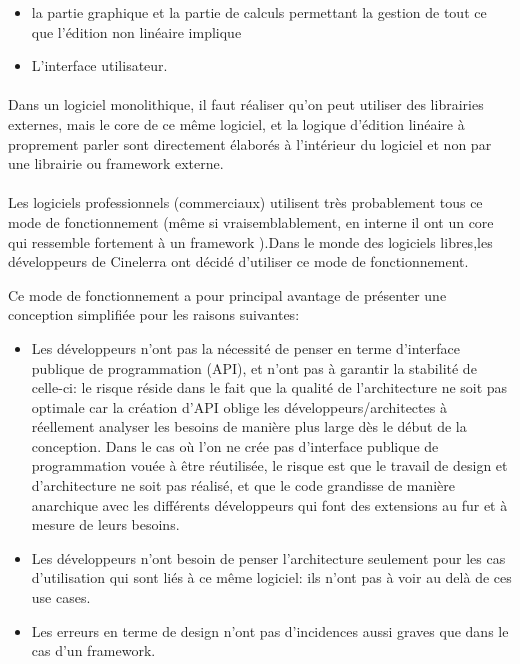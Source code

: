 \begin{itemize} \setlength{\itemsep}{2mm}

  \item {la partie graphique et la partie de calculs
    permettant la gestion de tout ce que l'édition non linéaire
    implique}

  \item {L'interface utilisateur.}

\end {itemize}

\paragraph{}

Dans un logiciel monolithique, il faut réaliser qu'on
peut utiliser des librairies externes, mais le core de ce même logiciel,
et la logique d'édition linéaire à proprement parler sont directement
élaborés à l'intérieur du logiciel et non par une librairie ou
framework  externe.

\paragraph{}

Les logiciels professionnels (commerciaux) utilisent très probablement
tous ce mode de fonctionnement (même si vraisemblablement,
en interne il ont un core qui ressemble fortement à un framework
).Dans le monde des logiciels libres,les développeurs
de Cinelerra ont décidé d'utiliser ce mode de fonctionnement.

Ce mode de fonctionnement a pour principal avantage de présenter une
conception simplifiée pour les raisons suivantes:


\begin{itemize} \setlength{\itemsep}{2mm}

  \item {Les développeurs n'ont pas la nécessité de penser
    en terme d'interface publique de programmation (API), et
    n'ont pas à garantir la stabilité de celle-ci: le risque réside
    dans le fait que la qualité de l'architecture ne soit pas optimale
    car la création d'API oblige les développeurs/architectes
    à réellement analyser les besoins de manière plus large dès
    le début de la conception. Dans le cas où l'on ne crée pas
    d'interface publique de programmation vouée à être réutilisée,
    le risque est que le travail de design et d'architecture ne soit
    pas réalisé, et que le code grandisse de manière anarchique avec
    les différents développeurs qui font des extensions au fur et à
    mesure de leurs besoins.}

  \item {Les développeurs n'ont besoin de penser l'architecture seulement
  pour les cas d'utilisation qui sont liés à ce même logiciel:
    ils n'ont pas à voir au delà de ces use cases.}

  \item {Les erreurs en terme de design n'ont pas d'incidences aussi
    graves que dans le cas d'un framework.}
\end {itemize}


